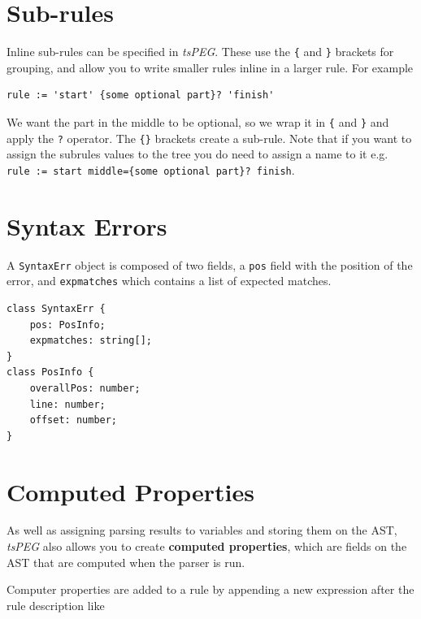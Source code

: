 \section{Sub-rules}\label{sub-rules}

Inline sub-rules can be specified in \emph{tsPEG}. These use the
\texttt{\{} and \texttt{\}} brackets for grouping, and allow you to
write smaller rules inline in a larger rule. For example

\begin{verbatim}
rule := 'start' {some optional part}? 'finish'
\end{verbatim}

We want the part in the middle to be optional, so we wrap it in
\texttt{\{} and \texttt{\}} and apply the \texttt{?} operator. The
\texttt{\{\}} brackets create a sub-rule. Note that if you want to
assign the subrules values to the tree you do need to assign a name to
it e.g.
\texttt{rule\ :=\ \textquotesingle{}start\textquotesingle{}\ middle=\{some\ optional\ part\}?\ \textquotesingle{}finish\textquotesingle{}}.

\hypertarget{syntax-errors}{\section{Syntax
Errors}\label{syntax-errors}}

A \texttt{SyntaxErr} object is composed of two fields, a \texttt{pos}
field with the position of the error, and \texttt{expmatches} which
contains a list of expected matches.

\begin{verbatim}
class SyntaxErr {
    pos: PosInfo;
    expmatches: string[];
}
class PosInfo {
    overallPos: number;
    line: number;
    offset: number;
}
\end{verbatim}

\hypertarget{computed-properties}{\section{Computed
Properties}\label{computed-properties}}

As well as assigning parsing results to variables and storing them on
the AST, \emph{tsPEG} also allows you to create \textbf{computed
properties}, which are fields on the AST that are computed when the
parser is run.

Computer properties are added to a rule by appending a new expression
after the rule description like


